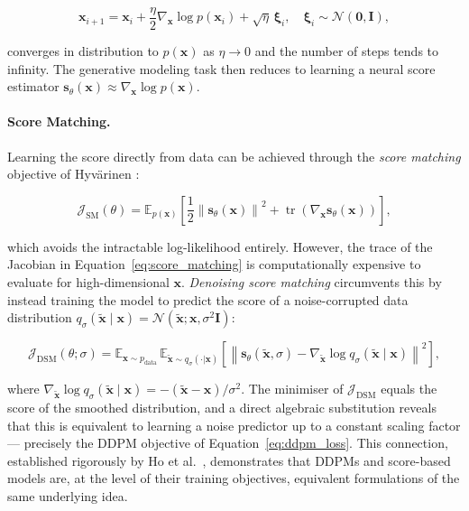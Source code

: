 \begin{equation}
    \mathbf{x}_{i+1} = \mathbf{x}_i +
    \frac{\eta}{2}\nabla_{\mathbf{x}} \log p(\mathbf{x}_i) +
    \sqrt{\eta}\,\boldsymbol{\xi}_i, \quad
    \boldsymbol{\xi}_i \sim \mathcal{N}(\mathbf{0}, \mathbf{I}),
    \label{eq:langevin}
\end{equation}

converges in distribution to $p(\mathbf{x})$ as $\eta \to 0$ and the number
of steps tends to infinity. The generative modeling
task then reduces to learning a neural score estimator
$\mathbf{s}_\theta(\mathbf{x}) \approx \nabla_{\mathbf{x}} \log p(\mathbf{x})$.

\paragraph{Score Matching.}
Learning the score directly from data can be achieved through the
\emph{score matching} objective of Hyvärinen \cite{hyvarinen2005estimation}:

\begin{equation}
    \mathcal{J}_{\text{SM}}(\theta) =
    \mathbb{E}_{p(\mathbf{x})}\left[
    \frac{1}{2}\left\|\mathbf{s}_\theta(\mathbf{x})\right\|^2
    + \operatorname{tr}\!\left(\nabla_{\mathbf{x}} \mathbf{s}_\theta(\mathbf{x})\right)
    \right],
    \label{eq:score_matching}
\end{equation}

which avoids the intractable log-likelihood entirely. However, the trace of
the Jacobian in Equation~\ref{eq:score_matching} is computationally expensive
to evaluate for high-dimensional $\mathbf{x}$. \emph{Denoising score matching}
\cite{vincent2011connection} circumvents this by instead training the model
to predict the score of a noise-corrupted data distribution $q_\sigma(\tilde{\mathbf{x}}
\mid \mathbf{x}) = \mathcal{N}(\tilde{\mathbf{x}}; \mathbf{x}, \sigma^2 \mathbf{I})$:

\begin{equation}
    \mathcal{J}_{\text{DSM}}(\theta; \sigma) =
    \mathbb{E}_{\mathbf{x} \sim p_{\text{data}}}\,
    \mathbb{E}_{\tilde{\mathbf{x}} \sim q_\sigma(\cdot|\mathbf{x})}\left[
    \left\|\mathbf{s}_\theta(\tilde{\mathbf{x}}, \sigma) -
    \nabla_{\tilde{\mathbf{x}}} \log q_\sigma(\tilde{\mathbf{x}} \mid \mathbf{x})
    \right\|^2\right],
    \label{eq:denoising_score_matching}
\end{equation}

\noindent where $\nabla_{\tilde{\mathbf{x}}} \log q_\sigma(\tilde{\mathbf{x}} \mid \mathbf{x})
= -(\tilde{\mathbf{x}} - \mathbf{x}) / \sigma^2$. The minimiser of
$\mathcal{J}_{\text{DSM}}$ equals the score of the smoothed distribution,
and a direct algebraic substitution reveals that this is equivalent to
learning a noise predictor up to a constant scaling factor — precisely the
DDPM objective of Equation~\ref{eq:ddpm_loss}. This connection,
established rigorously by Ho et al.\ \cite{ho2020denoising}, demonstrates
that DDPMs and score-based models are, at the level of their training objectives,
equivalent formulations of the same underlying idea.


